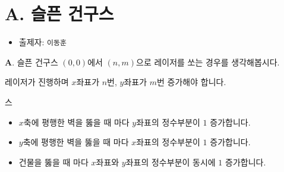 \section{A. 슬픈 건구스}

\begin{frame} %
    \begin{itemize}
        \item 출제자: \texttt{이동훈}
    \end{itemize}
\end{frame}

\begin{frame}{\textbf{A}. 슬픈 건구스}
    $(0, 0)$에서 $(n, m)$으로 레이저를 쏘는 경우를 생각해봅시다.

    \vspace{18pt}
    
    레이저가 진행하며 $x$좌표가 $n$번, $y$좌표가 $m$번 증가해야 합니다. 
    
    \vspace{18pt}스
    \begin{itemize}
        \item $x$축에 평행한 벽을 뚫을 때 마다 $y$좌표의 정수부분이 $1$ 증가합니다.
        \item $y$축에 평행한 벽을 뚫을 때 마다 $x$좌표의 정수부분이 $1$ 증가합니다.
        \item 건물을 뚫을 때 마다 $x$좌표와 $y$좌표의 정수부분이 동시에 $1$ 증가합니다.
    \end{itemize}

\end{frame}